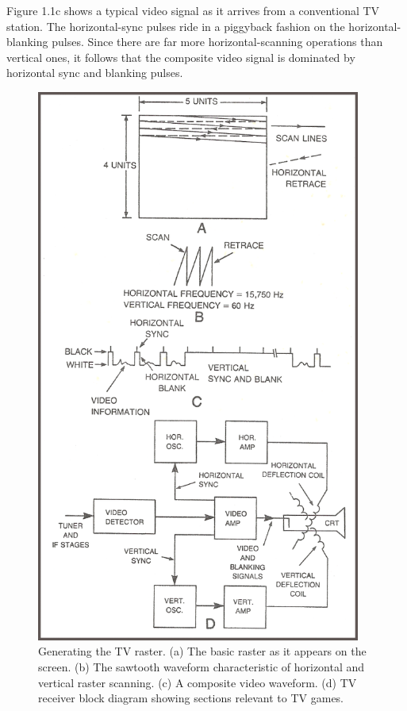 \documentclass[11pt]{book}              %
\begin{document}
Figure 1.1c shows a typical video signal as it arrives from a conventional TV station. The horizontal-sync pulses ride in a piggyback fashion on the horizontal-blanking pulses. Since there are far more horizontal-scanning operations than vertical ones, it follows that the composite video signal is dominated by horizontal sync and blanking pulses.

\begin{figure}
  \centering
  \includegraphics[width=0.95\textwidth]{images/fig1-1_clear}
  \caption{Generating the TV raster. (a) The basic raster as it appears on the screen. (b) The sawtooth waveform characteristic of horizontal and vertical raster scanning. (c) A composite video waveform. (d) TV receiver block diagram showing sections relevant to TV games.}
\end{figure}
\end{document}
